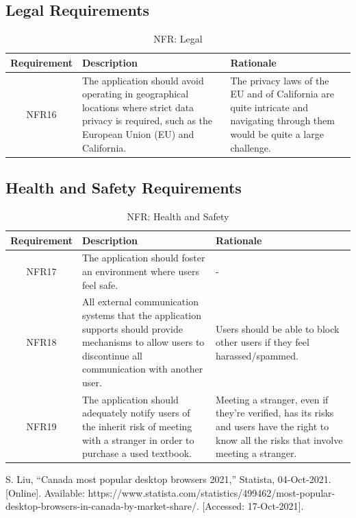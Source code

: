 \documentclass[fullpage]{article}
\begin{document}
\newpage

\subsection{Legal Requirements}
\begin{table}[h!]
\flushleft
\begin{tabular}{|c|p{6cm}|p{6cm}|}
\hline
 \rowcolor{lightgray} 
\textbf{Requirement} & \textbf{Description} & \textbf{Rationale} \\
\hline
NFR16 & The application should avoid operating in geographical locations where strict data privacy is required, such as the European Union (EU) and California. %
 & The privacy laws of the EU and of California are quite intricate and navigating through them would be quite a large challenge.\\
\hline
\end{tabular}
\caption{NFR: Legal}
\end{table}

\subsection{Health and Safety Requirements}
\begin{table}[h!]
\flushleft
\begin{tabular}{|c|p{6cm}|p{6cm}|}
\hline
 \rowcolor{lightgray} 
\textbf{Requirement} & \textbf{Description} & \textbf{Rationale} \\
\hline
NFR17 & The application should foster an environment where users feel safe. & -\\
\hline
NFR18& All external communication systems that the application supports should provide mechanisms to allow users to discontinue all communication with another user. & Users should be able to block other users if they feel harassed/spammed.\\
\hline
NFR19 & The application should adequately notify users of the inherit risk of meeting with a stranger in order to purchase a used textbook. & Meeting a stranger, even if they're verified, has its risks and users have the right to know all the risks that involve meeting a stranger.\\
\hline
\end{tabular}
\caption{NFR: Health and Safety}
\end{table}

\begin{thebibliography}{9}
S. Liu, “Canada most popular desktop browsers 2021,” Statista, 04-Oct-2021. [Online]. Available: https://www.statista.com/statistics/499462/most-popular-desktop-browsers-in-canada-by-market-share/. [Accessed: 17-Oct-2021]. 
\end{thebibliography}

\end{document}
